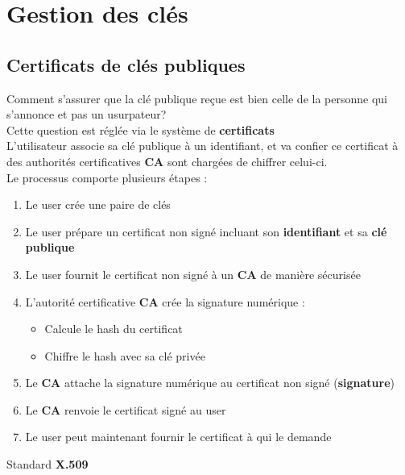 \documentclass{report}
\begin{document}
	\section{Gestion des clés}

		\subsection{Certificats de clés publiques}

			Comment s'assurer que la clé publique reçue est bien celle de la personne qui s'annonce et pas un usurpateur? \\

			Cette question est réglée via le système de \textbf{certificats}\\
			L'utilisateur associe sa clé publique à un identifiant, et va confier ce certificat à des authorités certificatives \textbf{CA} sont chargées de chiffrer celui-ci.\\

			Le processus comporte plusieurs étapes : \\

			\begin{enumerate}
				\item Le user crée une paire de clés
				\item Le user prépare un certificat non signé incluant son \textbf{identifiant} et sa \textbf{clé publique}
				\item Le user fournit le certificat non signé à un \textbf{CA} de manière sécurisée
				\item L'autorité certificative \textbf{CA} crée la signature numérique : \\
				\begin{itemize}
					\item Calcule le hash du certificat
					\item Chiffre le hash avec sa clé privée\\
				\end{itemize}
				\item Le \textbf{CA} attache la signature numérique au certificat non signé (\textbf{signature})
				\item Le \textbf{CA} renvoie le certificat signé au user
				\item Le user peut maintenant fournir le certificat à qui le demande\\	
			\end{enumerate}

			Standard \textbf{X.509}\\
\end{document}
